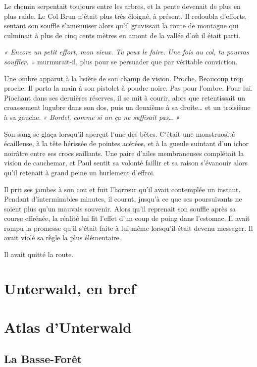 Le chemin serpentait toujours entre les arbres, et la pente devenait de plus en plus raide. Le Col Brun n’était plus très éloigné, à présent. Il redoubla d’efforts, sentant son souffle s’amenuiser alors qu’il gravissait la route de montagne qui culminait à plus de cinq cents mètres en amont de la vallée d’où il était parti.

\emph{« Encore un petit effort, mon vieux. Tu peux le faire. Une fois au col, tu pourras souffler. »} murmurait-il, plus pour se persuader que par véritable conviction.

Une ombre apparut à la lisière de son champ de vision. Proche. Beaucoup trop proche. Il porta la main à son pistolet à poudre noire. Pas pour l’ombre. Pour lui. Piochant dans ses dernières réserves, il se mit à courir, alors que retentissait un croassement lugubre dans son dos, puis un deuxième à sa droite… et un troisième à sa gauche. \emph{« Bordel, comme si un ça ne suffisait pas… »}

Son sang se glaça lorsqu’il aperçut l’une des bêtes. C’était une monstruosité écailleuse, à la tête hérissée de pointes acérées, et à la gueule suintant d’un ichor noirâtre entre ses crocs saillants. Une paire d’ailes membraneuses complétait la vision de cauchemar, et Paul sentit sa volonté faillir et sa raison s’évanouir alors qu’il retenait à grand peine un hurlement d’effroi.

Il prit ses jambes à son cou et fuit l’horreur qu’il avait contemplée un instant. Pendant d’interminables minutes, il courut, jusqu'à ce que ses poursuivants ne soient plus qu'un mauvais souvenir. Alors qu'il reprenait son souffle après sa course effrénée, la réalité lui fit l'effet d'un coup de poing dans l'estomac. Il avait rompu la promesse qu'il s'était faite à lui-même lorsqu'il était devenu messager. Il avait violé sa règle la plus élémentaire.

Il avait quitté la route.

\section{Unterwald, en bref}

\section{Atlas d'Unterwald}

\subsection{La Basse-Forêt}

